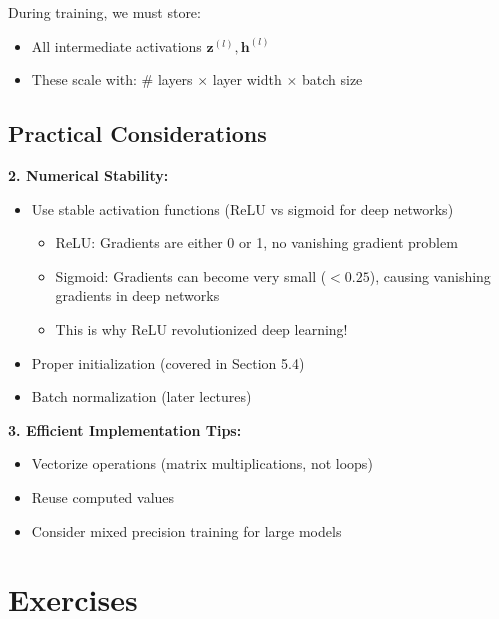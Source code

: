 \documentclass{article}
\begin{document}
During training, we must store:
\begin{itemize}
\item All intermediate activations $\mathbf{z}^{(l)}, \mathbf{h}^{(l)}$
\item These scale with: \# layers $\times$ layer width $\times$ batch size
\end{itemize}

\subsection{Practical Considerations}


\textbf{2. Numerical Stability:}
\begin{itemize}
\item Use stable activation functions (ReLU vs sigmoid for deep networks)
    \begin{itemize}
    \item ReLU: Gradients are either 0 or 1, no vanishing gradient problem
    \item Sigmoid: Gradients can become very small ($< 0.25$), causing vanishing gradients in deep networks
    \item This is why ReLU revolutionized deep learning!
    \end{itemize}
\item Proper initialization (covered in Section 5.4)
\item Batch normalization (later lectures)
\end{itemize}

\textbf{3. Efficient Implementation Tips:}
\begin{itemize}
\item Vectorize operations (matrix multiplications, not loops)
\item Reuse computed values
\item Consider mixed precision training for large models
\end{itemize}

\section{Exercises}

\end{document}
